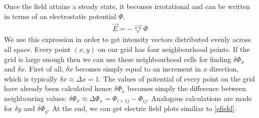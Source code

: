\documentclass[aps,twocolumn,pre,nofootinbib,10pt]{revtex4-1}
\begin{document}
Once the field attains a steady state, it becomes irrotational and can be written in terms of an electrostatic potential \begin{math} \Phi \end{math}. \begin{gather*} \vec{E} = -\vec{\bigtriangledown}\Phi \end{gather*} We use this expression in order to get intensity vectors distributed evenly across all space. Every point \begin{math} (x,y) \end{math} on our grid has four neighbourhood points. If the grid is large enough then we can use these neighbourhood cells for finding \begin{math} \delta \Phi_x\end{math} and \begin{math} \delta x \end{math}. First of all, \begin{math} \delta x \end{math} becomes simply equal to an increment in \begin{math}x\end{math} direction, which is typically \begin{math} \delta x \approx \Delta x = 1 \end{math}. The values of potential of every point on the grid have already been calculated hence \begin{math} \delta \Phi_x \end{math} becomes simply the difference between neighbouring values: \begin{math} \delta \Phi_x \approx \Delta \Phi_x = \Phi_{i+1 j} - \Phi_{ij} \end{math}. 
Analogous calculations are made for \begin{math} \delta y \end{math} and \begin{math} \delta \Phi_y \end{math}. At the end, we can get electric field plots similiar to \ref{efield}.
\end{document}
